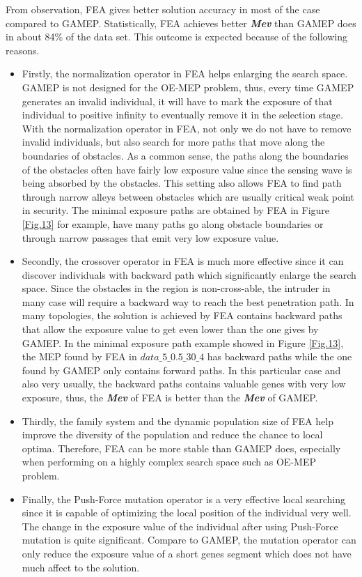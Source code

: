 \documentclass[final]{elsarticle}
\begin{document}
From observation, FEA gives better solution accuracy in most of the case compared to GAMEP. Statistically, FEA achieves better \textit{\textbf{Mev}} than GAMEP does in about 84\% of the data set. This outcome is expected because of  the following reasons.
\begin{itemize}
	\item Firstly, the normalization operator in FEA helps enlarging the search space. GAMEP is not designed for the OE-MEP problem, thus, every time GAMEP generates an invalid individual, it will have to mark the exposure of that individual to positive infinity to eventually remove it in the selection stage. With the normalization operator in FEA, not only we do not have to remove invalid individuals, but also search for more paths that move along the boundaries of obstacles. As a common sense, the paths along the boundaries of the obstacles often have fairly low exposure value since the sensing wave is being absorbed by the obstacles. This setting also allows FEA to find path through narrow alleys between obstacles which are usually critical weak point in security. The minimal exposure paths are obtained by FEA in Figure \ref{Fig.13} for example, have many paths go along obstacle boundaries or through narrow passages that emit very low exposure value.
	\item Secondly, the crossover operator in FEA is much more effective since it can discover individuals with backward path which significantly enlarge the search space. Since the obstacles in the region is non-cross-able, the intruder in many case will require a backward way to reach the best penetration path. In many topologies, the solution is achieved by FEA contains backward paths that allow the exposure value to get even lower than the one gives by GAMEP. In the minimal exposure path example showed in Figure \ref{Fig.13}, the MEP found by FEA in $data\_5\_0.5\_30\_4 $ has backward paths while the one found by GAMEP only contains forward paths. In this particular case and also very usually, the backward paths contains valuable genes with very low exposure, thus, the \textbf{\textit{Mev}} of FEA is better than the \textbf{\textit{Mev}} of GAMEP. 
	\item Thirdly, the family system and the dynamic population size of FEA help improve the diversity of the population and reduce the chance to local optima. Therefore, FEA can be more stable than GAMEP does, especially when performing on a highly complex search space such as OE-MEP problem.
	\item Finally, the Push-Force mutation operator is a very effective local searching since it is capable of optimizing the local position of the individual very well. The change in the exposure value of the individual after using Push-Force mutation is quite significant. Compare to GAMEP, the mutation operator can only reduce the exposure value of a short genes segment which does not have much affect to the solution. 
\end{itemize}
\end{document}
